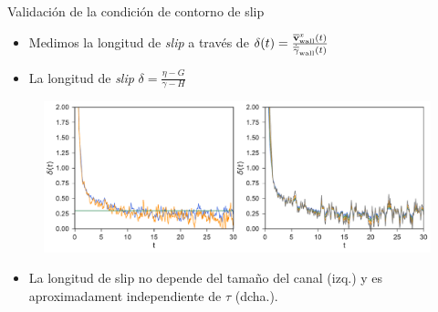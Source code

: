 \documentclass{beamer}
\begin{document}
\begin{frame}{Validación de la condición de contorno de slip}
  \begin{itemize}
    \item Medimos la longitud de \textit{slip} a través de 
 $\delta(t)=\frac{\overline{\bf v}^x_{\rm wall}(t)}{\dot{\overline{\gamma}}_{\rm wall}(t)}$
\item La longitud de \textit{slip} 
  $\delta =\frac{\eta -G}{\gamma-H}$
  \end{itemize}
  \begin{figure}[]
\includegraphics[width=\linewidth]{Slipt-17nodes-WALLS}
  \end{figure}
  \begin{itemize}
    \item La longitud de slip no depende del tamaño del canal (izq.) y es aproximadament independiente de $\tau$ (dcha.).
  \end{itemize}
\end{frame}
\end{document}

